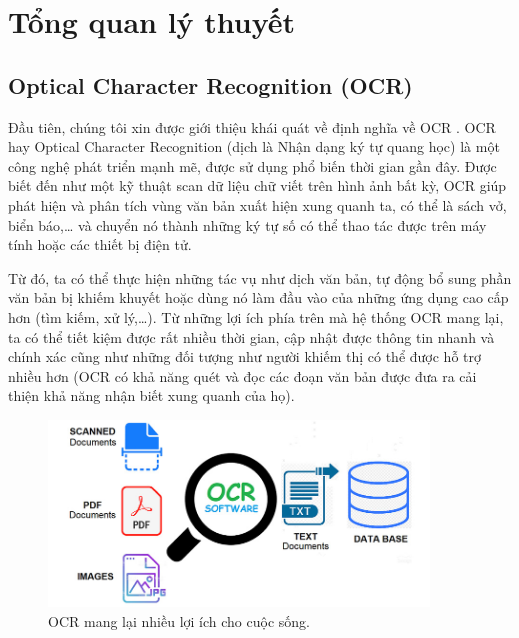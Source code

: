 \chapter{Tổng quan lý thuyết}
\label{Chapter2}

\section{Optical Character Recognition (OCR)}
Đầu tiên, chúng tôi xin được giới thiệu khái quát về định nghĩa về OCR \cite{impedovo1991optical}. OCR hay Optical Character Recognition (dịch là Nhận dạng ký tự quang học) là một công nghệ phát triển
mạnh mẽ, được sử dụng phổ biến thời gian gần đây. Được biết đến như một kỹ thuật scan
dữ liệu chữ viết trên hình ảnh bất kỳ, OCR giúp phát hiện và phân tích vùng văn bản xuất
hiện xung quanh ta, có thể là sách vở, biển báo,… và chuyển nó thành những ký tự số có
thể thao tác được trên máy tính hoặc các thiết bị điện tử.

Từ đó, ta có thể thực hiện những tác vụ như dịch văn bản, tự động bổ sung phần văn bản bị
khiếm khuyết hoặc dùng nó làm đầu vào của những ứng dụng cao cấp hơn (tìm kiếm, xử
lý,…). Từ những lợi ích phía trên mà hệ thống OCR mang lại, ta có thể tiết kiệm được rất
nhiều thời gian, cập nhật được thông tin nhanh và chính xác cũng như những đối tượng
như người khiếm thị có thể được hỗ trợ nhiều hơn (OCR có khả năng quét và đọc các đoạn
văn bản được đưa ra cải thiện khả năng nhận biết xung quanh của họ).

\begin{figure}
\centering
\includegraphics[width=0.9\textwidth]{mep_img/ocr-1.jpg}
\caption{OCR mang lại nhiều lợi ích cho cuộc sống. }\label{fig_2.1}
\end{figure}


